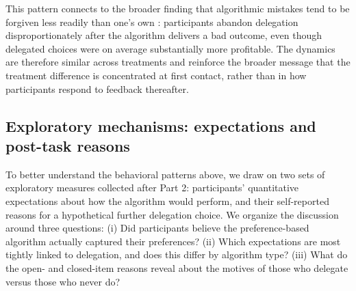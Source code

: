 \documentclass[a4paper, 12pt, fleqn]{article}
\theoremstyle{definition}
\begin{document}
This pattern connects to the broader finding that algorithmic mistakes tend to be forgiven less readily than one's own \citep{Dietvorst2018,Renier2021}: participants abandon delegation disproportionately after the algorithm delivers a bad outcome, even though delegated choices were on average substantially more profitable. The dynamics are therefore similar across treatments and reinforce the broader message that the treatment difference is concentrated at first contact, rather than in how participants respond to feedback thereafter.

\subsection{Exploratory mechanisms: expectations and post-task reasons}
\label{sec:exploratory_mechanisms}
To better understand the behavioral patterns above, we draw on two sets of exploratory measures collected after Part 2: participants' quantitative expectations about how the algorithm would perform, and their self-reported reasons for a hypothetical further delegation choice. We organize the discussion around three questions: (i) Did participants believe the preference-based algorithm actually captured their preferences? (ii) Which expectations are most tightly linked to delegation, and does this differ by algorithm type? (iii) What do the open- and closed-item reasons reveal about the motives of those who delegate versus those who never do?
\end{document}
